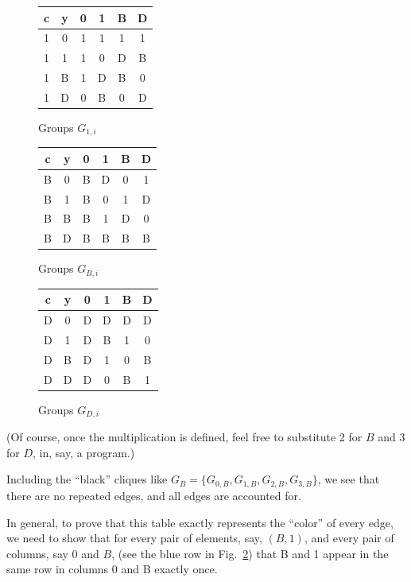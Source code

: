\documentclass[11pt, oneside]{article} 	%
\begin{document}
\begin{figure}[!htb]
\centering

 \begin{tabular}{c c | c c c c}
  c & y & 0 & 1 & B & D \\
\hline
  1 & 0 & 1 & 1 & 1 & 1 \\
  1 & 1 & 1 & 0 & D & B \\
  1 & B & 1 & D & B & 0 \\
  1 & D & 0 & B & 0 & D \\
  \end{tabular}
\caption{Groups $G_{1,i}$}
\label{fig:gf4-1}
\end{figure}

\begin{figure}[!htb]
\centering
 \begin{tabular}{c c | c c c c}
  c & y & 0 & 1 & B & D \\
\hline
  B & 0 & B & D & 0 & 1 \\
  B & 1 & B & 0 & 1 & D \\
  B & B & B & 1 & D & 0 \\
  B & D & B & B & B & B \\
  \end{tabular}
\caption{Groups $G_{B,i}$}
\label{fig:gf4-B}
\end{figure}

\begin{figure}[!htb]
\centering
 \begin{tabular}{c c | c c c c}
  c & y & 0 & 1 & B & D \\
\hline
  D & 0 & D & D & D & D \\
  D & 1 & D & B & 1 & 0 \\
  D & B & D & 1 & 0 & B \\
  D & D & D & 0 & B & 1 \\
  \end{tabular}
\caption{Groups $G_{D,i}$}
\label{fig:gf4-D}
\end{figure}

(Of course, once the multiplication is defined, feel free to substitute 2 for $B$ and 3 for $D$, in, say, a program.)


Including the ``black'' cliques like $G_B = \{G_{0,B}, G_{1,B}, G_{2,B}, G_{3,B}\}$, we see that there are no repeated edges, and all edges are accounted for. 

In general, to prove that this table exactly represents the ``color'' of every edge, we need to show that for every pair of elements, say, $(B, 1)$, and every pair of columns, say $0$ and $B$, (see the blue row in Fig.~\ref{fig:gf4-B}) that B and 1 appear in the same row in columns 0 and B exactly once. 
\end{document}
